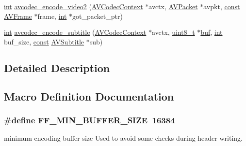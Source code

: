 \begin{DoxyCompactItemize}
\item 
\hyperlink{xmltok_8h_a5a0d4a5641ce434f1d23533f2b2e6653}{int} \hyperlink{group__lavc__encoding_gaa2dc9e9ea2567ebb2801a08153c7306b}{avcodec\+\_\+encode\+\_\+video2} (\hyperlink{struct_a_v_codec_context}{A\+V\+Codec\+Context} $\ast$avctx, \hyperlink{struct_a_v_packet}{A\+V\+Packet} $\ast$avpkt, \hyperlink{getopt1_8c_a2c212835823e3c54a8ab6d95c652660e}{const} \hyperlink{struct_a_v_frame}{A\+V\+Frame} $\ast$frame, \hyperlink{xmltok_8h_a5a0d4a5641ce434f1d23533f2b2e6653}{int} $\ast$got\+\_\+packet\+\_\+ptr)
\item 
\hyperlink{xmltok_8h_a5a0d4a5641ce434f1d23533f2b2e6653}{int} \hyperlink{group__lavc__encoding_ga37be256d85d78f665df27ad6c8f1d65b}{avcodec\+\_\+encode\+\_\+subtitle} (\hyperlink{struct_a_v_codec_context}{A\+V\+Codec\+Context} $\ast$avctx, \hyperlink{lib-src_2ffmpeg_2win32_2stdint_8h_a9a941819355e6f658991890ff66b4b0e}{uint8\+\_\+t} $\ast$\hyperlink{xlstr_8c_a781718f5b53a876fe91c424c4607fa8f}{buf}, \hyperlink{xmltok_8h_a5a0d4a5641ce434f1d23533f2b2e6653}{int} buf\+\_\+size, \hyperlink{getopt1_8c_a2c212835823e3c54a8ab6d95c652660e}{const} \hyperlink{struct_a_v_subtitle}{A\+V\+Subtitle} $\ast$sub)
\end{DoxyCompactItemize}


\subsection{Detailed Description}


\subsection{Macro Definition Documentation}
\subsubsection[{\texorpdfstring{F\+F\+\_\+\+M\+I\+N\+\_\+\+B\+U\+F\+F\+E\+R\+\_\+\+S\+I\+ZE}{FF_MIN_BUFFER_SIZE}}]{\setlength{\rightskip}{0pt plus 5cm}\#define F\+F\+\_\+\+M\+I\+N\+\_\+\+B\+U\+F\+F\+E\+R\+\_\+\+S\+I\+ZE~16384}\hypertarget{group__lavc__encoding_gacf94eb890b3b77383ec7fd728db8509c}{}\label{group__lavc__encoding_gacf94eb890b3b77383ec7fd728db8509c}
minimum encoding buffer size Used to avoid some checks during header writing. 

